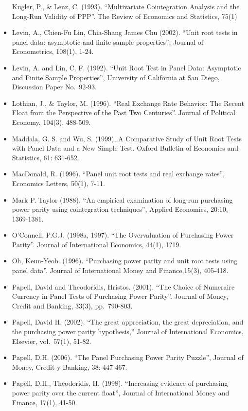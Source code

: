 \documentclass[]{article}
\begin{document}
\begin{itemize}
  Kugler, P., \& Lenz, C. (1993). ``Multivariate Cointegration Analysis and the Long-Run Validity of PPP''. The Review of Economics and Statistics, 75(1)
\item
  Levin, A., Chien-Fu Lin, Chia-Shang James Chu (2002). ``Unit root tests in panel data: asymptotic and finite-sample properties'', Journal of Econometrics, 108(1), 1-24.
\item
  Levin, A. and Lin, C. F. (1992). ``Unit Root Test in Panel Data: Asymptotic and Finite Sample Properties'', University of California at San Diego, Discussion Paper No.~92-93.
\item
  Lothian, J., \& Taylor, M. (1996). ``Real Exchange Rate Behavior: The Recent Float from the Perspective of the Past Two Centuries''. Journal of Political Economy, 104(3), 488-509.
\item
  Maddala, G. S. and Wu, S. (1999), A Comparative Study of Unit Root Tests with Panel Data and a New Simple Test. Oxford Bulletin of Economics and Statistics, 61: 631-652.
\item
  MacDonald, R. (1996). ``Panel unit root tests and real exchange rates'', Economics Letters, 50(1), 7-11.
\item
  Mark P. Taylor (1988). ``An empirical examination of long-run purchasing power parity using cointegration techniques'', Applied Economics, 20:10, 1369-1381.
\item
  O'Connell, P.G.J. (1998a, 1997). ``The Overvaluation of Purchasing Power Parity''. Journal of International Economics, 44(1), 1?19.
\item
  Oh, Keun-Yeob. (1996). ``Purchasing power parity and unit root tests using panel data''. Journal of International Money and Finance,15(3), 405-418.
\item
  Papell, David and Theodoridis, Hristos. (2001). ``The Choice of Numeraire Currency in Panel Tests of Purchasing Power Parity''. Journal of Money, Credit and Banking, 33(3), pp.~790-803.
\item
  Papell, David H. (2002). ``The great appreciation, the great depreciation, and the purchasing power parity hypothesis,'' Journal of International Economics, Elsevier, vol.~57(1), 51-82.
\item
  Papell, D.H. (2006). ``The Panel Purchasing Power Parity Puzzle'', Journal of Money, Credit y Banking, 38: 447-467.
\item
  Papell, D.H., Theodoridis, H. (1998). ``Increasing evidence of purchasing power parity over the current float'', Journal of International Money and Finance, 17(1), 41-50.

\end{itemize}
\end{document}
